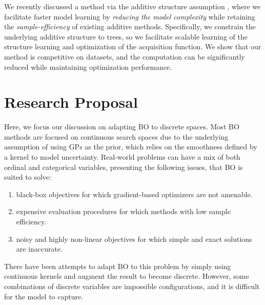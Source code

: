 \documentclass[
    american,a4paper
    ]{scrartcl}
\begin{document}
        We recently discussed a method via the additive structure assumption \cite{han2020high}, 
        where we facilitate faster model learning by \emph{reducing the model complexity} while retaining the \emph{sample-efficiency} of existing additive methods.
        Specifically, we constrain the underlying additive structure to trees, so we facilitate scalable learning of the structure learning and optimization of the acquisition function.
        We show that our method is competitive on datasets, and the computation can be significantly reduced while maintaining optimization performance.
        \section{Research Proposal}
        Here, we focus our discussion on adapting BO to discrete spaces. 
        Most BO methods are focused on continuous search spaces due to the underlying assumption of using GPs as the prior, 
        which relies on the smoothness defined by a kernel to model uncertainty. 
        Real-world problems can have a mix of both ordinal and categorical variables, presenting the following issues, that BO is suited to solve:
        \begin{enumerate}
            \item black-box objectives for which gradient-based optimizers are not amenable.
            \item expensive evaluation procedures for which methods with low sample efficiency.
            \item noisy and highly non-linear objectives for which simple and exact solutions are inaccurate.
        \end{enumerate}
        There have been attempts to adapt BO to this problem by simply using continuous kernels and augment the result to become discrete. 
        However, some combinations of discrete variables are impossible configurations, and it is difficult for the model to capture.
\end{document}
